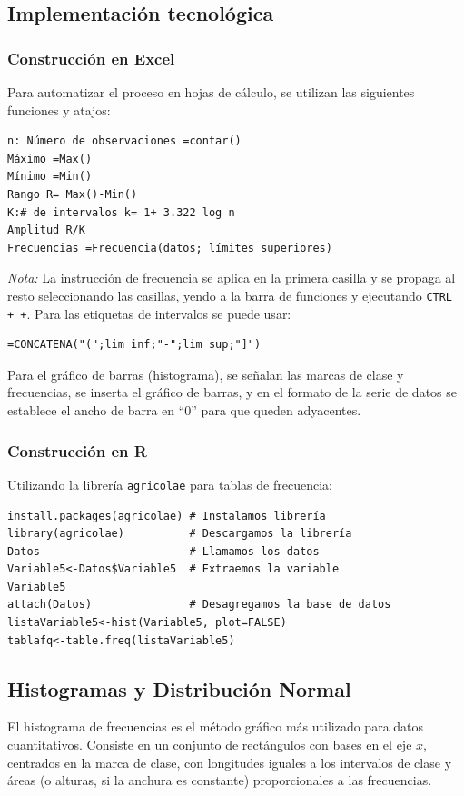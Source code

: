 \subsection{Implementación tecnológica}

\subsubsection{Construcción en Excel}
Para automatizar el proceso en hojas de cálculo, se utilizan las siguientes funciones y atajos:
\begin{verbatim}
n: Número de observaciones =contar()
Máximo =Max()
Mínimo =Min()
Rango R= Max()-Min()
K:# de intervalos k= 1+ 3.322 log n
Amplitud R/K
Frecuencias =Frecuencia(datos; límites superiores)
\end{verbatim}
\textit{Nota:} La instrucción de frecuencia se aplica en la primera casilla y se propaga al resto seleccionando las casillas, yendo a la barra de funciones y ejecutando \texttt{CTRL + +}.
Para las etiquetas de intervalos se puede usar:
\begin{verbatim}
=CONCATENA("(";lim inf;"-";lim sup;"]")
\end{verbatim}
Para el gráfico de barras (histograma), se señalan las marcas de clase y frecuencias, se inserta el gráfico de barras, y en el formato de la serie de datos se establece el ancho de barra en ``0'' para que queden adyacentes.

\subsubsection{Construcción en R}
Utilizando la librería \texttt{agricolae} para tablas de frecuencia:
\begin{verbatim}
install.packages(agricolae) # Instalamos librería
library(agricolae)          # Descargamos la librería
Datos                       # Llamamos los datos
Variable5<-Datos$Variable5  # Extraemos la variable
Variable5
attach(Datos)               # Desagregamos la base de datos
listaVariable5<-hist(Variable5, plot=FALSE)
tablafq<-table.freq(listaVariable5)
\end{verbatim}

\subsection{Histogramas y Distribución Normal}
El histograma de frecuencias es el método gráfico más utilizado para datos cuantitativos. Consiste en un conjunto de rectángulos con bases en el eje $x$, centrados en la marca de clase, con longitudes iguales a los intervalos de clase y áreas (o alturas, si la anchura es constante) proporcionales a las frecuencias.

